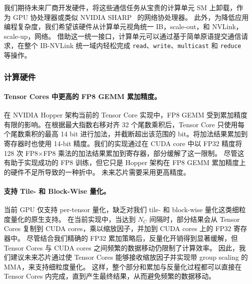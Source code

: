 \documentclass[11pt, a4paper, logo, copyright, nonumbering]{deepseek}
\begin{document}
我们期待未来厂商开发硬件，将这些通信任务从宝贵的计算单元 SM 上卸载，作为 GPU 协处理器或类似 NVIDIA SHARP~\cite{nvsharp} 的网络协处理器。
此外，为降低应用编程复杂度，我们希望该硬件从计算单元视角统一 IB，scale-out，和 NVLink，scale-up，网络。
借助这一统一接口，计算单元可以通过基于简单原语提交通信请求，在整个 IB-NVLink 统一域内轻松完成 \texttt{read}、\texttt{write}、\texttt{multicast} 和 \texttt{reduce} 等操作。

\subsubsection{计算硬件}

\paragraph{Tensor Cores 中更高的 FP8 GEMM 累加精度。}
在 NVIDIA Hopper 架构当前的 Tensor Core 实现中，FP8 GEMM 受到累加精度有限的影响。在根据最大指数右移对齐 32 个尾数乘积后，Tensor Core 只使用每个尾数乘积的最高 14 bit 进行加法，并截断超出该范围的 bit。将加法结果累加到寄存器时也使用 14-bit 精度。我们的实现通过在 CUDA core 中以 FP32 精度将 128 次 FP8$\times$FP8 乘法的加法结果累加到寄存器，部分缓解了这一限制。
尽管这有助于实现成功的 FP8 训练，但它只是 Hopper 架构在 FP8 GEMM 累加精度上的硬件不足所导致的一种折中。
未来芯片需要采用更高精度。

\paragraph{支持 Tile- 和 Block-Wise 量化。}
当前 GPU 仅支持 per-tensor 量化，缺乏对我们 tile- 和 block-wise 量化这类细粒度量化的原生支持。
在当前实现中，当达到 $N_C$ 间隔时，部分结果会从 Tensor Cores 复制到 CUDA cores，乘以缩放因子，并加到 CUDA cores 上的 FP32 寄存器中。
尽管结合我们精确的 FP32 累加策略后，反量化开销得到显著缓解，但 Tensor Cores 与 CUDA cores 之间频繁的数据移动仍限制了计算效率。
因此，我们建议未来芯片通过使 Tensor Cores 能够接收缩放因子并实现带 group scaling 的 MMA，来支持细粒度量化。
这样，整个部分和累加与反量化过程都可以直接在 Tensor Cores 内完成，直到产生最终结果，从而避免频繁的数据移动。
\end{document}
